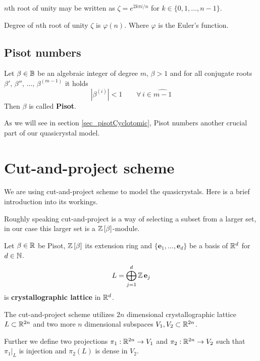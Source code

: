 \documentclass[text.tex]{subfiles}
\begin{document}
\begin{remark}
$n$th root of unity may be written as $\zeta = e^{2k\pi i/n}$ for $k\in \{0, 1, \dots, n-1\}$.
\end{remark}

\begin{theorem}
Degree of $n$th root of unity $\zeta$ is $\varphi(n)$. Where $\varphi$ is the Euler's function.
\end{theorem}

\subsection{Pisot numbers}
\begin{definition}
Let $\beta\in\mathbb{B}$ be an algebraic integer of degree $m$, $\beta>1$  and for all conjugate roots $\beta',\,\beta'',\,\dots ,\,\beta^{(m-1)}$ it holds
$$|\beta^{(i)}|<1\qquad \forall\, i\in\widehat{m-1}$$
Then $\beta$ is called \textbf{Pisot}.
\end{definition}

As we will see in section \ref{sec_pisotCyclotomic}, Pisot numbers another crucial part of our quasicrystal model. 

\section{Cut-and-project scheme}\label{sec_cutAndProject}%
We are using cut-and-project scheme to model the quasicrystals. Here is a brief introduction into its workings. 

Roughly speaking cut-and-project is a way of selecting a subset from a larger set, in our case this larger set is a $\mathbb{Z}\left[\beta\right]$-module. 

\begin{definition}
Let $\beta\in\mathbb{R}$ be Pisot, $\mathbb{Z}\left[\beta\right]$ its extension ring and $\{\mathbf{e}_1, \dots, \mathbf{e}_d\}$ be a basis of $\mathbb{R}^d$ for $d\in\mathbb{N}$. 
$$L = \bigoplus^d_{j=1}\mathbb{Z}\, \mathbf{e}_j$$
is \textbf{crystallographic lattice} in $\mathbb{R}^d$.
\end{definition} 

The cut-and-project scheme utilizes $2n$ dimensional crystallographic lattice $L\subset\mathbb{R}^{2n}$ and two more $n$ dimensional subspaces $V_1, V_2\subset\mathbb{R}^{2n}$. 

Further we define two projections $\pi_1:\mathbb{R}^{2n}\rightarrow V_1$ and $\pi_2:\mathbb{R}^{2n}\rightarrow V_2$ such that $\pi_1|_L$ is injection and $\pi_2(L)$ is dense in $V_2$. 
\end{document}
